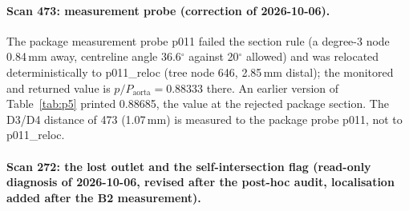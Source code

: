 \documentclass[11pt]{article}
\begin{document}
\paragraph{Scan 473: measurement probe (correction of 2026-10-06).} The package measurement probe p011 failed the section rule (a degree-3 node 0.84\,mm away, centreline angle 36.6$^\circ$ against 20$^\circ$ allowed) and was relocated deterministically to p011\_reloc (tree node 646, 2.85\,mm distal); the monitored and returned value is $p/P_\text{aorta}=0.88333$ there. An earlier version of Table~\ref{tab:p5} printed 0.88685, the value at the rejected package section. The D3/D4 distance of 473 (1.07\,mm) is measured to the package probe p011, not to p011\_reloc.

\paragraph{Scan 272: the lost outlet and the self-intersection flag (read-only diagnosis of 2026-10-06, revised after the post-hoc audit, localisation added after the B2 measurement).}
\end{document}
